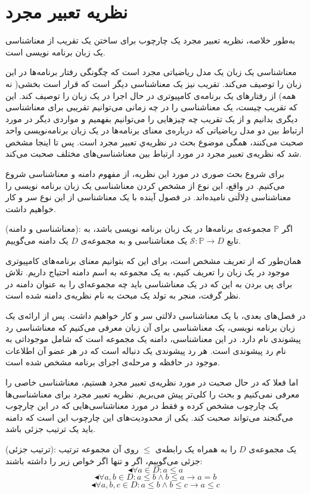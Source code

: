 



\section{نظریه تعبیر مجرد}

به‌طور خلاصه، نظریه تعبیر مجرد یک چارچوب برای ساختن یک تقریب از معناشناسی یک زبان‌ برنامه نویسی است. 

معناشناسی یک زبان یک مدل ریاضیاتی مجرد است که چگونگی رفتار برنامه‌ها در این زبان را توصیف می‌کند. 
تقریب نیز یک معناشناسی دیگر است که قرار است بخشی( نه همه) از رفتارهای یک برنامه‌ی کامپیوتری در حال اجرا در یک زبان را توصیف کند. این که تقریب چیست، یک معناشناسی را در چه زمانی می‌توانیم تقریبی برای معناشناسی دیگری بدانیم و از یک تقریب چه چیزهایی را می‌توانیم بفهمیم و مواردی دیگر در مورد ارتباط بین دو مدل ریاضیاتی که درباره‌ی معنای برنامه‌ها در یک زبان برنامه‌نویسی واحد صحبت می‌کنند، همگی موضوع بحث در نظریه‌ي تعبیر مجرد است.
پس تا اینجا مشخص شد که نظریه‌ی تعبیر مجرد در مورد ارتباط بین معناشناسی‌های مختلف صحبت می‌کند. 

برای شروع بحث صوری در مورد این نظریه، از مفهوم دامنه و معناشناسی شروع می‌کنیم.
در واقع، این نوع از مشخص کردن معناشناسی یک زبان برنامه نویسی را معناشناسی دِلالَتی نامیده‌اند. در فصول آینده با یک معناشناسی از این نوع سر و کار خواهیم داشت.
\begin{defn}
	(معناشناسی و دامنه): اگر $\mathbb{P}$ مجموعه‌ی برنامه‌ها در یک زبان برنامه نویسی باشد، به تابع 
	$\mathcal{S}:\mathbb{P} \rightarrow D$
	یک معناشناسی و به مجموعه‌ی $D$ یک دامنه می‌گوییم.
\end{defn}
همان‌طور که از تعریف مشخص است، برای این که بتوانیم معنای برنامه‌های کامپیوتری موجود در یک زبان را تعریف کنیم، به یک مجموعه به اسم دامنه احتیاج داریم. تلاش برای پی بردن به این که در یک معناشناسی باید چه مجموعه‌ای را به عنوان دامنه در نظر گرفت، منجر به تولد یک مبحث به نام نظریه‌ی دامنه شده است.

در فصل‌های بعدی، با یک معناشناسی دلالتی سر و کار خواهیم داشت. 
پس از ارائه‌ی یک زبان برنامه نویسی، یک معناشناسی برای آن زبان معرفی می‌کنیم که معناشناسی رد پیشوندی نام دارد. در این معناشناسی، دامنه یک مجموعه است که شامل موجوداتی به نام رد پیشوندی است. هر رد پیشوندی یک دنباله است که در هر عضو آن اطلاعات موجود در حافظه و مرحله‌ی اجرای برنامه مشخص شده است. 

اما فعلا که در حال صحبت در مورد نظریه‌ی تعبیر مجرد هستیم، معناشناسی خاصی را معرفی نمی‌کنیم و بحث را کلی‌تر پیش می‌بریم. نظریه تعبیر مجرد برای معناشناسی‌ها یک چارچوب مشخص کرده و فقط در مورد معناشناسی‌هایی که در این چارچوب می‌گنجند می‌تواند صحبت کند. یکی از محدودیت‌های این چارچوب این است که دامنه باید یک ترتیب جزئی باشد.
\begin{defn}
	(ترتیب جزئی): یک مجموعه‌ی $D$ را به همراه یک رابطه‌ی $\leq$ روی آن مجموعه ترتیب جزئی می‌گوییم، اگر و تنها اگر خواص زیر را داشته باشند:
	$$\blacktriangleleft \forall a \in D: a\leq a$$
	$$\blacktriangleleft \forall a,b \in D: a \leq b \land b \leq a \rightarrow a=b$$
	$$\blacktriangleleft \forall a,b,c \in D: a \leq b \land b \leq c \rightarrow a \leq c$$
\end{defn}

